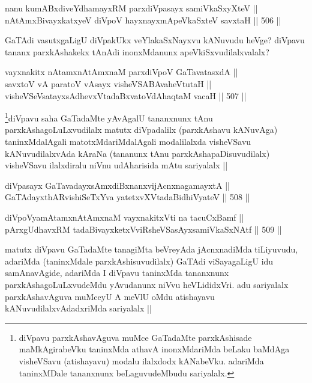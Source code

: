 \begin{shl}
nanu kumABxdiveYdhamayxRM parxdiVpasayx samiVkaSxyXteV || \\
nA\s \s tAmxBivayxkatxyeV diVpoV hayxnayxmApeVkaSxteV savxtaH ||  506 ||  
\end{shl}

\begin{artha}
GaTAdi  vasutxgaLigU diVpakUkx veYlakaSxNayxvu kANuvudu heVge? diVpavu tananx parxkAshakekx tAnAdi inonxMdanunx apeVkiSxvudilalxvalalx? 
\end{artha}


\begin{shl}
vayxnakitx nA\s \s tamxnA\s \s tAmxnaM parxdiVpoV GaTavatasxdA || \\
savxtoV vA paratoV vA\s sayx visheVSABAvaheVtutaH ||  \\
visheVSeV\s satayxsAdhevxVtadaBxvatoVdAhaqtaM vacaH ||  507 ||  
\end{shl}

\begin{artha}
\footnote{diVpavu parxkAshavAguva muMce GaTadaMte parxkAshisade maMkAgirabeVku taninxMda athavA inonxMdariMda beLaku baMdAga visheVSavu (atishayavu) modalu ilalxdodx kANabeVku. adariMda taninxMDale tananxnunx beLaguvudeMbudu sariyalalx.}diVpavu saha GaTadaMte yAvAgalU tananxnunx tAnu parxkAshagoLuLxvudilalx matutx diVpadalilx (parxkAshavu kANuvAga) taninxMdalAgali matotxMdariMdalAgali modalilalxda visheVSavu kANuvudilalxvAda kAraNa (tananunx tAnu parxkAshapaDisuvudilalx) visheVSavu ilalxdiralu niVnu udAharisida mAtu sariyalalx ||
\end{artha}

\begin{shl}
diVpasayx GaTavadayxsAmxdiBxnanxvijAcnxnagamayxtA || \\
GaTAdayxthARvishiSeTxYva yatetxvXVtadaBidhiVyateV ||  508 ||  
\end{shl}
				
\begin{shl}
diVpoV\s yamAtamxnA\s \s tAmxnaM vayxnakitxVti na tacuCxBamf || \\
pArxgUdhavxRM tadaBivayxketxVviRsheVSasAyxsamiVkaSxNAtf ||  509 ||  
\end{shl}

\begin{artha}
matutx diVpavu GaTadaMte tanagiMta beVreyAda jAcnxnadiMda tiLiyuvudu, adariMda (taninxMdale parxkAshisuvudilalx) GaTAdi viSayagaLigU idu samAnavAgide, adariMda I diVpavu taninxMda tananxnunx parxkAshagoLuLxvudeMdu yAvudanunx niVvu heVLididxVri. adu sariyalalx parxkAshavAguva muMceyU A meVlU oMdu atishayavu kANuvudilalxvAdadxriMda sariyalalx ||
\end{artha}

